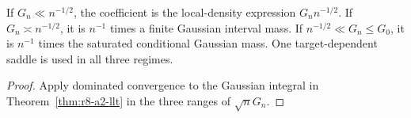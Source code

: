 \begin{corollary}
\label{cor:r8-a2-regimes}
If $G_n\ll n^{-1/2}$, the coefficient is the local-density expression
$G_n n^{-1/2}$.  If $G_n\asymp n^{-1/2}$, it is $n^{-1}$ times a finite Gaussian
interval mass.  If $n^{-1/2}\ll G_n\le G_0$, it is $n^{-1}$ times the saturated
conditional Gaussian mass.  One target-dependent saddle is used in all three
regimes.
\end{corollary}

\begin{proof}
Apply dominated convergence to the Gaussian integral in
Theorem~\ref{thm:r8-a2-llt} in the three ranges of $\sqrt nG_n$.
\end{proof}

